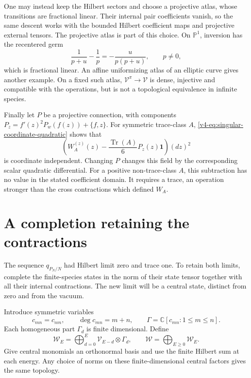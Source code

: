 One may instead keep the Hilbert sectors
and choose a projective atlas, whose
transitions are fractional linear.
Their internal pair coefficients vanish,
so the same descent works with the
bounded Hilbert coefficient maps and
projective external tensors. The
projective atlas is part of this choice.
On \(\mathbb P^1\), inversion has the
recentered germ
\[
                    \frac1{p+u}-\frac1p=-\frac{u}{p(p+u)},
                    \qquad p\ne0,
\]
which is fractional linear. An affine
uniformizing atlas of an elliptic curve
gives another example. On a fixed such
atlas, \(\mathcal V^\pi\to\mathcal V\)
is dense, injective and compatible with
the operations, but is not a topological
equivalence in infinite species.

Finally let \(P\) be a projective connection,
with components
\(P_z=f'(z)^2P_w(f(z))+\{f,z\}\).
For symmetric trace-class \(A\),
\eqref{v4-eq:singular-coordinate-quadratic}
shows that
\[
 \left(W_A^{(z)}(z)
      -\frac{\operatorname{Tr}(A)}6P_z(z)\mathbf1\right)(dz)^2
\]
is coordinate independent. Changing \(P\)
changes this field by the corresponding
scalar quadratic differential. For a
positive non-trace-class \(A\), this
subtraction has no value in the stated
coefficient domain. It requires a trace,
an operation stronger than the cross
contractions which defined \(W_A\).

\section{A completion retaining the contractions}
\label{v4-sec:singular-contraction-completion}

The sequence \(q_{P_N/N}\) had Hilbert limit
zero and trace one. To retain both limits,
complete the finite-species states in the
norm of their state tensor together with
all their internal contractions. The new
limit will be a central state, distinct
from zero and from the vacuum.

Introduce symmetric variables
\[
 c_{mn}=c_{nm},\qquad \deg c_{mn}=m+n,
 \qquad \Gamma=\mathbb C[c_{mn}:1\leq m\leq n].
\]
Each homogeneous part \(\Gamma_d\) is finite
dimensional. Define
\begin{equation}\label{v4-eq:singular-contraction-space}
 \mathcal W_E=\bigoplus_{d=0}^E
                 \mathcal V_{E-d}\otimes\Gamma_d,
 \qquad \mathcal W=\bigoplus_{E\geq0}\mathcal W_E.
\end{equation}
Give central monomials an orthonormal basis
and use the finite Hilbert sum at each energy.
Any choice of norms on these finite-dimensional
central factors gives the same topology.

